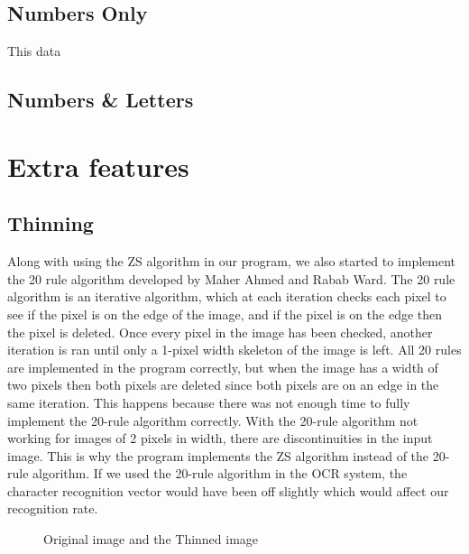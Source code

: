 \documentclass{article}
\begin{document}
\begin{multicols}{2}
\subsection{Numbers Only}
This data
\subsection{Numbers \& Letters}
\section{Extra features}
\subsection{Thinning}
Along with using the ZS algorithm in our program, we also started to implement the 20 rule algorithm developed by Maher Ahmed and Rabab Ward.  The 20 rule algorithm is an iterative algorithm, which at each iteration checks each pixel to see if the pixel is on the edge of the image, and if the pixel is on the edge then the pixel is deleted.  Once every pixel in the image has been checked, another iteration is ran until only a 1-pixel width skeleton of the image is left.  All 20 rules are implemented in the program correctly, but when the image has a width of two pixels then both pixels are deleted since both pixels are on an edge in the same iteration.  This happens because there was not enough time to fully implement the 20-rule algorithm correctly. With the 20-rule algorithm not working for images of 2 pixels in width, there are discontinuities in the input image. This is why the program implements the ZS algorithm instead of the 20-rule algorithm.  If we used the 20-rule algorithm in the OCR system, the character recognition vector would have been off slightly which would affect our recognition rate.  

\begin{figure}
\centering

\caption{Original image and the Thinned image}
\label{fig:my_label}
\end{figure}



\end{multicols}
\end{document}
